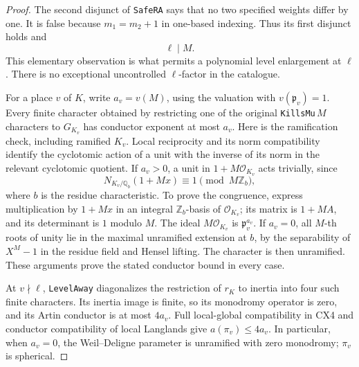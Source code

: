 \begin{proof}
The second disjunct of \texttt{SafeRA} says that no two
specified weights differ by one.  It is false because
$m_1=m_2+1$ in one-based indexing.  Thus its first disjunct
holds and
\[
                              \ell\mid M.                    \tag{CX.17}
\]
This elementary observation is what permits a polynomial
level enlargement at $\ell$.  There is no exceptional
uncontrolled $\ell$-factor in the catalogue.

For a place $v$ of $K$, write $a_v=v(M)$, using the valuation
with $v(\mathfrak p_v)=1$.  Every finite character obtained by
restricting one of the original \texttt{KillsMu}$\,M$
characters to $G_{K_v}$ has conductor exponent at most $a_v$.
Here is the ramification check, including ramified $K_v$.
Local reciprocity and its norm compatibility identify the
cyclotomic action of a unit with the inverse of its norm in
the relevant cyclotomic quotient.  If $a_v>0$, a unit in
$1+M\mathcal O_{K_v}$ acts trivially, since
\[
 N_{K_v/\mathbb Q_b}(1+M x)\equiv1\pmod{M\mathbb Z_b},
                                                               \tag{CX.18}
\]
where $b$ is the residue characteristic.  To prove the
congruence, express multiplication by $1+Mx$ in an integral
$\mathbb Z_b$-basis of $\mathcal O_{K_v}$; its matrix is
$1+M A$, and its determinant is $1$ modulo $M$.  The ideal
$M\mathcal O_{K_v}$ is $\mathfrak p_v^{a_v}$.
If $a_v=0$, all $M$-th roots of unity lie in the maximal
unramified extension at $b$, by the separability of
$X^M-1$ in the residue field and Hensel lifting.  The character
is then unramified.  These arguments prove the stated
conductor bound in every case.

At $v\nmid\ell$, \texttt{LevelAway} diagonalizes the
restriction of $r_K$ to inertia into four such finite
characters.  Its inertia image is finite, so its monodromy
operator is zero, and its Artin conductor is at most $4a_v$.
Full local-global compatibility in CX4 and conductor
compatibility of local Langlands give
$a(\pi_v)\le4a_v$.  In particular, when $a_v=0$, the
Weil--Deligne parameter is unramified with zero monodromy;
$\pi_v$ is spherical.


\end{proof}
